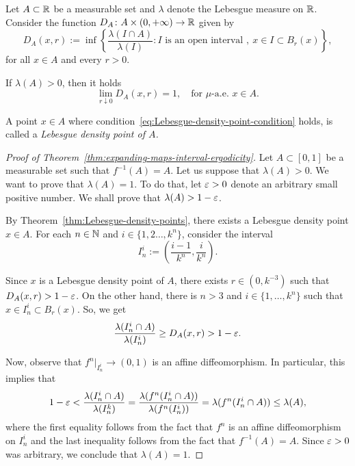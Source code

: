 \begin{theorem}
  \label{thm:Lebesgue-density-points}
  Let $A\subset\mathbb{R}$ be a measurable set and $\lambda$ denote the Lebesgue measure on $\mathbb{R}$. Consider the function $D_A\colon A\times (0,+\infty)\to\mathbb{R}$ given by
  \begin{displaymath}
    D_A(x,r):=\inf\left\{\frac{\lambda(I\cap A)}{\lambda(I)} : I \text{ is an open interval },\ x\in I\subset B_r(x)\right\},
  \end{displaymath}
  for all $x\in A$ and every $r>0$.

  If $\lambda(A)>0$, then it holds
  \begin{equation}
    \label{eq:Lebesgue-density-point-condition}
    \lim_{r\downarrow 0} D_A(x,r)=1, \quad\text{for }\mu\text{-a.e. } x\in A.
  \end{equation}

  A point $x\in A$ where condition~\eqref{eq:Lebesgue-density-point-condition} holds, is called a \emph{Lebesgue density point of $A$.}
\end{theorem}

\begin{proof}[Proof of Theorem~\ref{thm:expanding-maps-interval-ergodicity}]
  Let $A\subset [0,1]$ be a measurable set such that $f^{-1}(A)=A$. Let us suppose that $\lambda(A)>0$. We want to prove that $\lambda(A)=1$. To do that, let $\varepsilon>0$ denote an arbitrary small positive number. We shall prove that $\lambda(A)>1-\varepsilon$.

  By Theorem~\ref{thm:Lebesgue-density-points}, there exists a Lebesgue density point $x\in A$. For each $n\in\mathbb{N}$ and $i\in\{1,2\ldots,k^n\}$, consider the interval
  \begin{displaymath}
    I_n^i := \left(\frac{i-1}{k^n},\frac{i}{k^n}\right).
  \end{displaymath}

  Since $x$ is a Lebesgue density point of $A$, there exists $r\in(0,k^{-3})$ such that $D_A(x,r)>1-\varepsilon$. On the other hand, there is $n>3$ and $i\in\{1,\ldots,k^n\}$ such that $x\in I_n^i\subset B_r(x)$. So, we get
  \begin{displaymath}
    \frac{\lambda(I_n^i\cap A)}{\lambda(I_n^i)} \geq D_A(x,r) > 1-\varepsilon.
  \end{displaymath}

  Now, observe that $f^n\big|_{I_n^i}\to (0,1)$ is an affine diffeomorphism. In particular, this implies that
  \begin{displaymath}
    1-\varepsilon<\frac{\lambda(I_n^i\cap A)}{\lambda(I_n^k)}=\frac{\lambda(f^n(I_n^i\cap A))}{\lambda(f^n(I_n^i))} = \lambda(f^n(I_n^i\cap A))\leq \lambda(A),
  \end{displaymath}
  where the first equality follows from the fact that $f^n$ is an affine diffeomorphism on $I_n^i$ and the last inequality follows from the fact that $f^{-1}(A)=A$. Since $\varepsilon>0$ was arbitrary, we conclude that $\lambda(A)=1$.
\end{proof}


